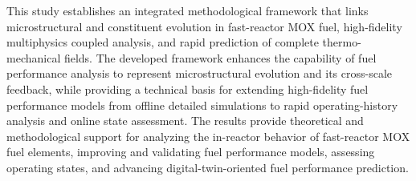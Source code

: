 \begin{englishabstract}
	This study establishes an integrated methodological framework that links microstructural and constituent evolution in fast-reactor MOX fuel, high-fidelity multiphysics coupled analysis, and rapid prediction of complete thermo-mechanical fields. The developed framework enhances the capability of fuel performance analysis to represent microstructural evolution and its cross-scale feedback, while providing a technical basis for extending high-fidelity fuel performance models from offline detailed simulations to rapid operating-history analysis and online state assessment. The results provide theoretical and methodological support for analyzing the in-reactor behavior of fast-reactor MOX fuel elements, improving and validating fuel performance models, assessing operating states, and advancing digital-twin-oriented fuel performance prediction.
	
	
	
\end{englishabstract}